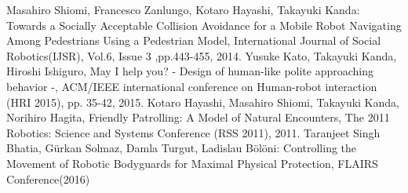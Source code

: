 \documentclass{kuisthesis}
\begin{document}
\begin{thebibliography}{3}
 Masahiro Shiomi, Francesco Zanlungo, Kotaro Hayashi, Takayuki Kanda: Towards a Socially Acceptable Collision Avoidance for a Mobile Robot Navigating Among Pedestrians Using a Pedestrian Model, International Journal of Social Robotics(IJSR), Vol.6, Issue 3 ,pp.443-455, 2014.
 Yusuke Kato, Takayuki Kanda, Hiroshi Ishiguro, May I help you? - Design of human-like polite approaching behavior -, ACM/IEEE international conference on Human-robot interaction (HRI 2015), pp. 35-42, 2015.
 Kotaro Hayashi, Masahiro Shiomi, Takayuki Kanda, Norihiro Hagita, Friendly Patrolling: A Model of Natural Encounters, The 2011 Robotics: Science and Systems Conference (RSS 2011), 2011.
 Taranjeet Singh Bhatia, Gürkan Solmaz, Damla Turgut, Ladislau Bölöni: Controlling the Movement of Robotic Bodyguards for Maximal Physical Protection, FLAIRS Conference(2016)
\end{thebibliography}
\end{document}
